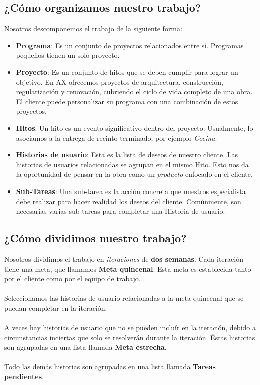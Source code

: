 \subsection{¿Cómo organizamos nuestro trabajo?}
Nosotros descomponemos el trabajo de la siguiente forma:

\begin{itemize}
  \item \textbf{Programa}: Es un conjunto de proyectos relacionados entre sí. 
  Programas pequeños tienen un solo proyecto.
  \item \textbf{Proyecto}: Es un conjunto de hitos que se deben cumplir para 
  lograr un objetivo. En AX ofrecemos proyectos de arquitectura, construcción, 
  regularización y renovación, cubriendo el ciclo de vida completo de una obra. 
  El cliente puede personalizar su programa con una combinación de estos proyectos.
  \item \textbf{Hitos}: Un hito es un evento significativo dentro del proyecto. 
  Usualmente, lo asociamos a la entrega de recinto terminado, por ejemplo \emph{Cocina}.
  \item \textbf{Historias de usuario}: Esta es la lista de deseos de nuestro cliente. 
  Las historias de usuarios relacionadas se agrupan en el mismo Hito. Esto nos da la 
  oportunidad de pensar en la obra como un \emph{producto} enfocado en el cliente.
  \item \textbf{Sub-Tareas}: Una sub-tarea es la acción concreta que nuestros 
  especialista debe realizar para hacer realidad los deseos del cliente. Comúnmente, 
  son necesarias varias sub-tareas para completar una Historia de usuario.
\end{itemize}

\subsection{¿Cómo dividimos nuestro trabajo?}
Nosotros dividimos el trabajo en \emph{iteraciones} de \textbf{dos semanas}. Cada iteración 
tiene una meta, que llamamos \textbf{Meta quincenal}. Esta meta es establecida 
tanto por el cliente como por el equipo de trabajo.

\paragraph{}
Seleccionamos las historias de usuario relacionadas a la meta quincenal que se 
puedan completar en la iteración.

\paragraph{}
A veces hay historias de usuario que no se pueden incluír en la iteración, debido 
a circunstancias inciertas que solo se resolverán durante la iteración. Éstas 
historias son agrupadas en una lista llamada \textbf{Meta estrecha}.

\paragraph{}
Todo las demás historias son agrupadas en una lista llamada 
\textbf{Tareas pendientes}.